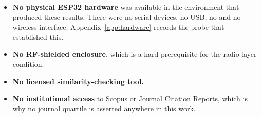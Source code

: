 \begin{itemize}[leftmargin=1.6em,itemsep=4pt]
  \item \textbf{No physical ESP32 hardware} was available in the environment that produced
        these results. There were no serial devices, no USB, no  and no
        wireless interface. Appendix~\ref{app:hardware} records the probe that established
        this.
  \item \textbf{No RF-shielded enclosure}, which is a hard prerequisite for the radio-layer
        condition.
  \item \textbf{No licensed similarity-checking tool.}
  \item \textbf{No institutional access} to Scopus or Journal Citation Reports, which is why no
        journal quartile is asserted anywhere in this work.
\end{itemize}
